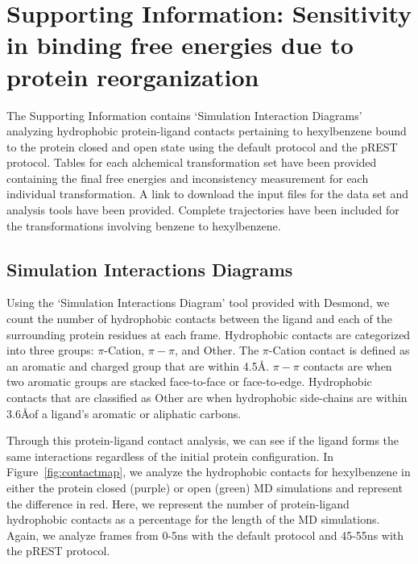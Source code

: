 \section{Supporting Information: Sensitivity in binding free energies due to protein reorganization}
The Supporting Information contains `Simulation Interaction Diagrams' analyzing hydrophobic protein-ligand contacts pertaining to hexylbenzene bound to the protein closed and open state using the default protocol and the pREST protocol.
Tables for each alchemical transformation set have been provided containing the final free energies and inconsistency measurement for each individual transformation.
A link to download the input files for the data set and analysis tools have been provided.
Complete trajectories have been included for the transformations involving benzene to hexylbenzene.


\subsection{Simulation Interactions Diagrams}
Using the `Simulation Interactions Diagram' tool provided with Desmond, we count the number of hydrophobic contacts between the ligand and each of the surrounding protein residues at each frame.
Hydrophobic contacts are categorized into three groups: $\pi$-Cation, $\pi-\pi$, and Other.
The $\pi$-Cation contact is defined as an aromatic and charged group that are within 4.5\AA.
$\pi-\pi$ contacts are when two aromatic groups are stacked face-to-face or face-to-edge.
Hydrophobic contacts that are classified as Other are when hydrophobic side-chains are within 3.6\AA of a ligand's aromatic or aliphatic carbons.

Through this protein-ligand contact analysis, we can see if the ligand forms the same interactions regardless of the initial protein configuration.
In Figure~\ref{fig:contactmap}, we analyze the hydrophobic contacts for hexylbenzene in either the protein closed (purple) or open (green) MD simulations and represent the difference in red.
Here, we represent the number of protein-ligand hydrophobic contacts as a percentage for the length of the MD simulations.
Again, we analyze frames from 0-5ns with the default protocol and 45-55ns with the pREST protocol.

